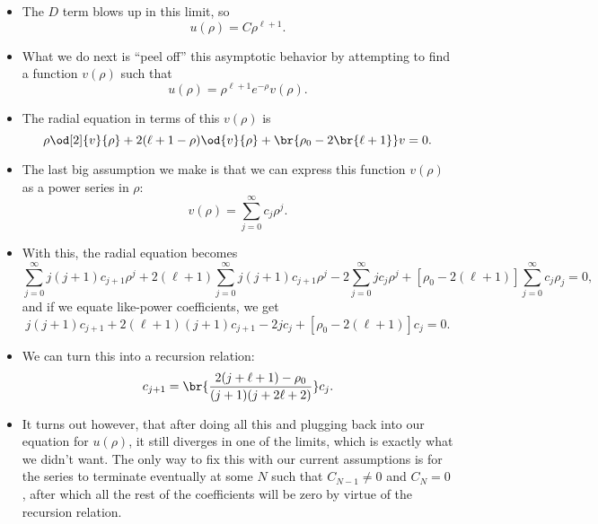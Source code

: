 \begin{itemize}
    \item The $D$ term blows up in this limit, so 
        \begin{equation}
            u(\rho) = C\rho^{\ell+1}.
        \end{equation}
    \item What we do next is ``peel off'' this asymptotic behavior by attempting to find a function $v(\rho)$ such that
        \begin{equation}
            u(\rho) = \rho^{\ell+1}e^{-\rho}v(\rho).
        \end{equation}
    \item The radial equation in terms of this $v(\rho)$ is
        \begin{equation}
            \rho\od[2]{v}{\rho} + 2(\ell + 1 - \rho)\od{v}{\rho} + \br{\rho_0 - 2\br{\ell + 1}}v = 0.
        \end{equation}
    \item The last big assumption we make is that we can express this function $v(\rho)$ as a power series in $\rho$:
        \begin{equation}
            v(\rho) = \sum_{j=0}^{\infty}c_j\rho^j.
        \end{equation}
    \item With this, the radial equation becomes
        \begin{equation}
            \sum_{j=0}^{\infty}j(j+1)c_{j+1}\rho^j + 2(\ell+1)\sum_{j=0}^{\infty}j(j+1)c_{j+1}\rho^j - 2\sum_{j=0}^{\infty}jc_j\rho^j + [\rho_0 - 2(\ell+1)]\sum_{j=0}^{\infty}c_j\rho_j = 0,
        \end{equation}
        and if we equate like-power coefficients, we get 
        \begin{equation}
            j(j+1)c_{j+1} + 2(\ell+1)(j+1)c_{j+1} - 2jc_j + [\rho_0 - 2(\ell+1)]c_j = 0.
        \end{equation}
    \item We can turn this into a recursion relation:
        \begin{equation}
            c_{j+1} = \br{\frac{2(j + \ell + 1) - \rho_0}{(j + 1)(j + 2\ell + 2)}}c_j.
        \end{equation}
    \item It turns out however, that after doing all this and plugging back into our equation for $u(\rho)$, it still diverges in one of the limits, which is exactly what we didn't want. The only way to fix this with our current assumptions is for the series to terminate eventually at some $N$ such that $C_{N-1} \neq 0$ and $C_N = 0$, after which all the rest of the coefficients will be zero by virtue of the recursion relation.

\end{itemize}
